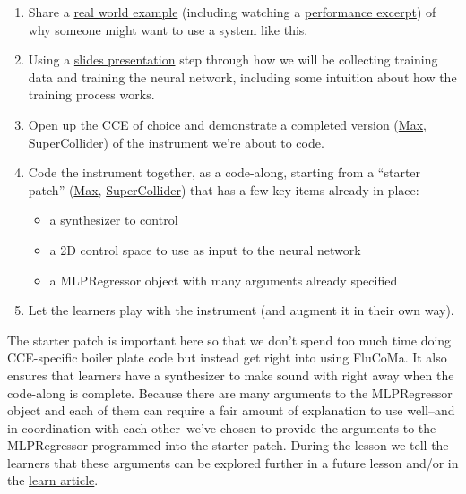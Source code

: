 \documentclass{article}
\providecommand{\tightlist}{%
  \setlength{\itemsep}{0pt}\setlength{\parskip}{0pt}}
\begin{document}
\begin{enumerate}
\def\labelenumi{\arabic{enumi}.}
\tightlist
\item
  Share a
  \href{https://f003.backblazeb2.com/file/learnassets/examples/teaching-material/regressor-example.pdf}{real
  world example} (including watching a
  \href{https://youtu.be/qTHJaryNgBo}{performance excerpt}) of why
  someone might want to use a system like this.
\item
  Using a
  \href{https://f003.backblazeb2.com/file/learnassets/examples/teaching-material/regressor-process.pdf}{slides
  presentation} step through how we will be collecting training data and
  training the neural network, including some intuition about how the
  training process works.
\item
  Open up the CCE of choice and demonstrate a completed version
  (\href{https://learn.flucoma.org/examples/regressor-video-demo.maxpat}{Max},
  \href{https://learn.flucoma.org/examples/regressor-video-complete-server.scd}{SuperCollider})
  of the instrument we're about to code.
\item
  Code the instrument together, as a code-along, starting from a
  ``starter patch''
  (\href{https://learn.flucoma.org/examples/regressor-video-starter.maxpat}{Max},
  \href{https://learn.flucoma.org/examples/regressor-video-starter.scd}{SuperCollider})
  that has a few key items already in place:

  \begin{itemize}
  \tightlist
  \item
    a synthesizer to control
  \item
    a 2D control space to use as input to the neural network
  \item
    a MLPRegressor object with many arguments already specified
  \end{itemize}
\item
  Let the learners play with the instrument (and augment it in their own
  way).
\end{enumerate}

The starter patch is important here so that we don't spend too
much time doing CCE-specific boiler plate code but instead get right
into using FluCoMa. It also ensures that learners have a synthesizer to
make sound with right away when the code-along is complete. Because
there are many arguments to the MLPRegressor object and each of them can
require a fair amount of explanation to use well--and in coordination
with each other--we've chosen to provide the arguments to the
MLPRegressor programmed into the starter patch. During the lesson we
tell the learners that these arguments can be explored further in a
future lesson and/or in the
\href{https://learn.flucoma.org/learn/mlp-parameters/}{learn article}.
\end{document}
